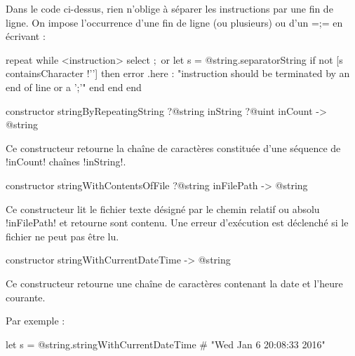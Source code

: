 Dans le code ci-dessus, rien n'oblige à séparer les instructions par une fin de ligne. On impose l'occurrence d'une fin de ligne (ou plusieurs) ou d'un \ggst=;= en écrivant :

\begin{galgas3}
repeat
while
  <instruction>
  select
   $;$
  or
    let s = @string.separatorString
    if not [s containsCharacter !'\n'] then
      error .here
       : "instruction should be terminated by an end of line or a ';'"
    end
  end
end
\end{galgas3}




\begin{galgas3box}
constructor stringByRepeatingString
  ?@string inString
  ?@uint inCount
  -> @string
\end{galgas3box}

Ce constructeur retourne la chaîne de caractères constituée d'une séquence de \ggst!inCount! chaînes \ggst!inString!.









\begin{galgas3box}
constructor stringWithContentsOfFile ?@string inFilePath -> @string
\end{galgas3box}

Ce constructeur lit le fichier texte désigné par le chemin relatif ou absolu \ggst!inFilePath! et retourne sont contenu. Une erreur d'exécution est déclenché si le fichier ne peut pas être lu.







\begin{galgas3box}
constructor stringWithCurrentDateTime -> @string
\end{galgas3box}

Ce constructeur retourne une chaîne de caractères contenant la date et l'heure courante.

Par exemple :
\begin{galgas3}
let s = @string.stringWithCurrentDateTime # "Wed Jan  6 20:08:33 2016"
\end{galgas3}








